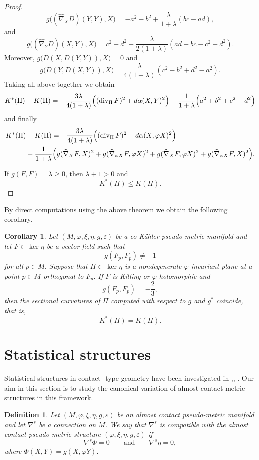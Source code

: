 \documentclass[12pt,a4paper,final]{amsart}
\numberwithin{equation}{section}
\newtheorem{wn}[tw]{Corollary}
\theoremstyle{df}
\newtheorem{df}[tw]{Definition}
\newcommand{\eps}{\varepsilon}
\begin{document}
\begin{proof}
$$
g\bigl((\widehat{\nabla}_XD)(Y,Y),X\bigr)
=
-a^2-b^2+\frac{\lambda}{1+\lambda}(bc-ad),
$$
and
$$
g\bigl((\widehat{\nabla}_YD)(X,Y),X\bigr)
=
c^2+d^2+\frac{\lambda}{2(1+\lambda)}(ad-bc-c^2-d^2).
$$
Moreover, 
$
g\bigl(D(X,D(Y,Y)),X\bigr)=0
$
and
\begin{equation}\label{eq::phisectional::7}
g\bigl(D(Y,D(X,Y)),X\bigr)
=
\frac{\lambda}{4(1+\lambda)}(c^2-b^2+d^2-a^2).
\end{equation}
Taking all above together
 we obtain
$$
K^\ast(\Pi)-K(\Pi)
=
-\frac{3\lambda}{4(1+\lambda)}
\Bigl((\operatorname{div}_\Pi F)^2+d\alpha(X,Y)^2\Bigr)
-\frac{1}{1+\lambda}\Bigl(
a^2+b^2+c^2+d^2
\Bigr)
$$
and finally
\begin{align*}
K^\ast(\Pi)&-K(\Pi)= -\frac{3\lambda}{4(1+\lambda)}
\Bigl((\operatorname{div}_\Pi F)^2+d\alpha(X,\varphi X)^2\Bigr)\\
&-\frac{1}{1+\lambda}\Bigl(
g(\widehat{\nabla}_XF,X)^2+g(\widehat{\nabla}_{\varphi X}F,\varphi X)^2+g(\widehat{\nabla}_XF,\varphi X)^2+g(\widehat{\nabla}_{\varphi X}F,X)^2
\Bigr).
\end{align*}
\par If $g(F,F)=\lambda\geq 0$, then $\lambda+1>0$ and
$$
K^\ast(\Pi)\leq K(\Pi).
$$
\end{proof}
By direct computations using the above theorem we obtain the following corollary.
\begin{wn}\label{wn::phisectional}
Let $(M,\varphi,\xi,\eta,g,\eps)$ be a co-K\"ahler pseudo-metric manifold and
let $F\in\ker\eta$ be a vector field such that
$$
g(F_p,F_p)\neq -1
$$
for all $p\in M$. Suppose that $\Pi\subset\ker\eta$ is a nondegenerate
$\varphi$-invariant plane at a point $p\in M$ orthogonal to $F_p$. If $F$ is
Killing or $\varphi$-holomorphic and
$$
g(F_p,F_p)=-\frac{2}{3},
$$
then the sectional curvatures of $\Pi$ computed with respect to $g$ and $g^\ast$
coincide, that is,
$$
K^\ast(\Pi)=K(\Pi).
$$
\end{wn}



\section{Statistical structures}
 Statistical structures in contact-
type geometry have been investigated in \cite{AM},\cite{FHOS}, \cite{YKM}. Our aim in this section is to study the canonical variation of almost contact metric structures in this framework.
\begin{df}\label{df::compat}
Let $(M,\varphi,\xi,\eta,g,\eps)$ be an almost contact pseudo-metric manifold
and let $\nabla^s$ be a connection on $M$. We say that $\nabla^s$ is
\emph{compatible with the almost contact pseudo-metric structure}
$(\varphi,\xi,\eta,g,\eps)$ if
$$
\nabla^s\Phi=0 \qquad \text{and} \qquad \nabla^s\eta=0,
$$
where $\Phi(X,Y)=g(X,\varphi Y)$.
\end{df}
\end{document}
